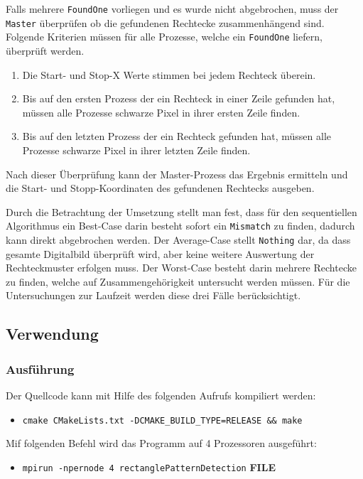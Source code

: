 Falls mehrere \texttt{FoundOne} vorliegen und es wurde nicht abgebrochen, muss der \texttt{Master} überprüfen ob die gefundenen Rechtecke zusammenhängend sind.
Folgende Kriterien müssen für alle Prozesse, welche ein \texttt{FoundOne} liefern, überprüft werden.

\begin{enumerate}
	\item Die Start- und Stop-X Werte stimmen bei jedem Rechteck überein.
	\item Bis auf den ersten Prozess der ein Rechteck in einer Zeile gefunden hat, müssen alle Prozesse schwarze Pixel in ihrer ersten Zeile finden.
	\item Bis auf den letzten Prozess der ein Rechteck gefunden hat, müssen alle Prozesse schwarze Pixel in ihrer letzten Zeile finden.
\end{enumerate}

Nach dieser Überprüfung kann der Master-Prozess das Ergebnis ermitteln und die Start- und Stopp-Koordinaten des gefundenen Rechtecks ausgeben. 

Durch die Betrachtung der Umsetzung stellt man fest, dass für den sequentiellen Algorithmus ein Best-Case darin besteht sofort ein \texttt{Mismatch} zu finden, dadurch kann direkt abgebrochen werden. 
Der Average-Case stellt \texttt{Nothing} dar, da dass gesamte Digitalbild überprüft wird, aber keine weitere Auswertung der Rechteckmuster erfolgen muss.
Der Worst-Case besteht darin mehrere Rechtecke zu finden, welche auf Zusammengehörigkeit untersucht werden müssen.
Für die Untersuchungen zur Laufzeit werden diese drei Fälle berücksichtigt.

\subsection{Verwendung}
\subsubsection{Ausführung}
Der Quellcode kann mit Hilfe des folgenden Aufrufs kompiliert werden:

\begin{itemize}
	\item \texttt{cmake CMakeLists.txt -DCMAKE\_BUILD\_TYPE=RELEASE \&\& make}
\end{itemize}

Mif folgenden Befehl wird das Programm auf 4 Prozessoren ausgeführt:

\begin{itemize}
	\item \texttt{mpirun -npernode 4 rectanglePatternDetection} \textbf{FILE}
\end{itemize}

